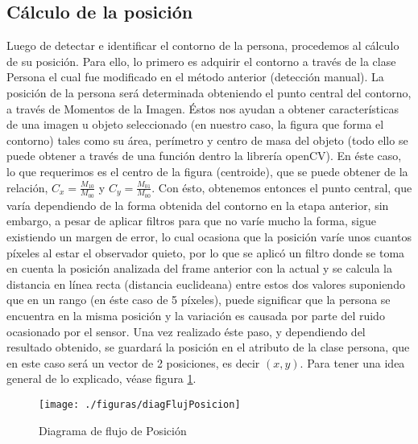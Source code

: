 \documentclass[a4paper,openright,12pt]{report}
\begin{document}
\subsection{Cálculo de la posición}
Luego de detectar e identificar el contorno de la persona, procedemos al cálculo de su posición. Para ello, lo primero es adquirir el contorno a través de la clase Persona el cual fue modificado en el método anterior (detección manual). La posición de la persona será determinada obteniendo el punto central del contorno, a través de Momentos de la Imagen. Éstos nos ayudan a obtener características de una imagen u objeto seleccionado (en nuestro caso, la figura que forma el contorno) tales como su área, perímetro y centro de masa del objeto (todo ello se puede obtener a través de una función dentro la librería openCV). En éste caso, lo que requerimos es el centro de la figura (centroide), que se puede obtener de la relación, $C_x = \frac{M_{10}}{M_{00}}$ y $C_y = \frac{M_{01}}{M_{00}}$.  Con ésto, obtenemos entonces el punto central, que varía dependiendo de la forma obtenida del contorno en la etapa anterior, sin embargo, a pesar de aplicar filtros para que no varíe mucho la forma, sigue existiendo un margen de error, lo cual ocasiona que la posición varíe unos cuantos píxeles al estar el observador quieto, por lo que se aplicó un filtro donde se toma en cuenta la posición analizada del frame anterior con la actual y se calcula la distancia en línea recta (distancia euclideana) entre estos dos valores suponiendo que en un rango (en éste caso de 5 píxeles), puede significar que la persona se encuentra en la misma posición y la variación es causada por parte del ruido ocasionado por el sensor. Una vez realizado éste paso, y dependiendo del resultado obtenido, se guardará la posición en el atributo de la clase persona, que en este caso será un vector de 2 posiciones, es decir $ (x,y) $. Para tener una idea general de lo explicado, véase figura \ref{fig:diagFlujPosicion}.
\begin{figure}[ht]
	\centering
	\texttt{[image: ./figuras/diagFlujPosicion]}
	\caption{Diagrama de flujo de Posición} \label{fig:diagFlujPosicion}
\end{figure}
\end{document}
